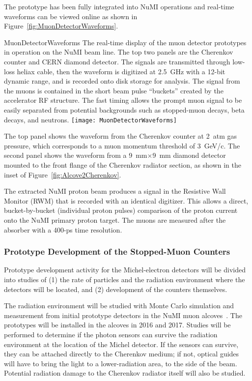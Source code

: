 The prototype has been fully integrated into NuMI operations and
real-time waveforms can be viewed online as shown in
Figure~\ref{fig:MuonDetectorWaveforms}.
\begin{cdrfigure}{MuonDetectorWaveforms}
{The real-time display of the muon detector prototypes in operation
on the NuMI beam line. The top two panels are the Cherenkov counter
and CERN diamond detector. The signals are
transmitted through low-loss heliax cable, then the waveform
is digitized at 2.5~GHz with a 12-bit dynamic range, and is
recorded onto disk storage for analysis. The signal from the
muons is contained in the short beam pulse ``buckets'' created
by the accelerator RF structure. The fast timing allows the
prompt muon signal to be easily separated from potential backgrounds
such as stopped-muon decays, beta decays, and neutrons.}
\texttt{[image: MuonDetectorWaveforms]}
\end{cdrfigure}
The top panel shows the waveform from the Cherenkov counter at 2~atm
gas pressure, which corresponds to a muon momentum threshold of
3~GeV/c. The second panel shows the waveform from a 9~mm$\times$9~mm
diamond detector mounted to the front flange of the Cherenkov radiator
section, as shown in the inset of Figure~\ref{fig:Alcove2Cherenkov}.

The extracted NuMI proton beam produces a signal in the Resistive Wall
Monitor (RWM) that is recorded with an identical digitizer. This allows a direct,
bucket-by-bucket (individual proton pulses) comparison of the proton
current onto the NuMI primary proton target. The muons are measured
after the absorber with a 400-ps time resolution.

\subsubsection{Prototype Development of the Stopped-Muon Counters}

Prototype development activity for the Michel-electron detectors will
be divided into studies of (1) the rate of particles and the radiation environment where
the detectors will be located, and (2) development of the counters
themselves.

The radiation environment will be studied with Monte Carlo
simulation and measurement from initial prototype detectors
in the NuMI muon alcoves~\cite{ref:NuMIBeamMonitors}.
The prototypes will be installed in the alcoves in 2016 and 2017.
Studies will be performed to determine if the photon sensors
can survive the radiation environment at the location of the Michel
detector. If the sensors can survive, they can be attached directly to
the Cherenkov medium; if not, optical guides will have to bring the
light to a lower-radiation area, to the side of the beam. Potential
radiation damage to the Cherenkov radiator itself will also be
studied.

